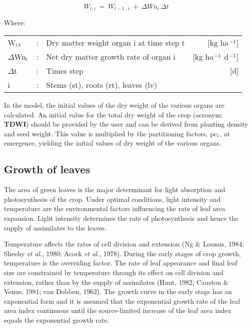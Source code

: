 \begin{equation}
\label{eq:5.49}
W _{t,i} ~=~W _{t-1\, ,\, i} ~+~\Delta Wn _{i} \,\Delta t
\end{equation}

Where:\\[5pt]
\begin{tabularx}{\textwidth}{llXr}
	W$_{{\rm i,t}}$ &:& Dry matter weight organ i at time step t   &
	[kg ha$^{{\rm -1}}$]\\
	$\Delta$Wn$_{{\rm i}}$ &:& Net dry matter growth rate of organ i   &
	[kg ha$^{{\rm -1}}$ d$^{{\rm -1}}$]\\
	$\Delta$t &:& Times step   &
	[d]\\
	i &:& Stems (st), roots (rt), leaves (lv)\\
\end{tabularx}

In the model, the initial values of the dry weight of the various organs are calculated. An initial value for the total dry weight of the crop (acronym: {\bf TDWI}) should be provided by the user and can be derived from planting density and seed weight. This value is multiplied by the partitioning factors, pc$_{{\rm i}}$, at emergence, yielding the initial values of dry weight of the various organs.

\subsection{Growth of leaves}
\label{sec:growthofleaves}
The area of green leaves is the major determinant for light absorption and photosynthesis
of the crop. Under optimal conditions, light intensity and temperature are the environmental factors influencing the rate of leaf area expansion. Light intensity determines the
rate of photosynthesis and hence the supply of assimilates to the leaves.

Temperature affects the rates of cell division and extension (Ng \& Loomis, 1984; Sheehy {\it et al.}, 1980; Acock {\it et al.}, 1978). During the early stages of crop growth, temperature is the overriding factor. The rate of leaf appearance and final leaf size are constrained by temperature through its effect on cell division and extension, rather than by the supply of assimilates (Hunt, 1982; Causton \& Venus, 1981; van Dobben, 1962). The growth curve in the early stage has an exponential form and it is assumed that the exponential growth rate of the leaf area index continuous until the source-limited increase of the leaf area index equals the exponential growth rate.

